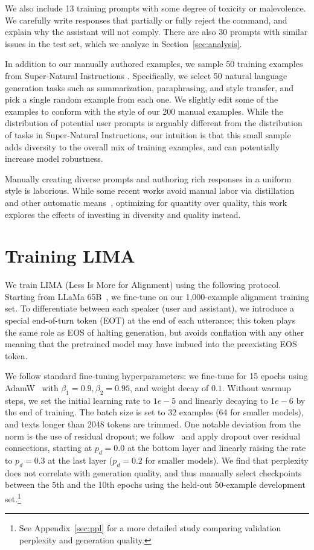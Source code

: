 \documentclass{article}
\begin{document}
We also include 13 training prompts with some degree of toxicity or malevolence.
We carefully write responses that partially or fully reject the command, and explain why the assistant will not comply.
There are also 30 prompts with similar issues in the test set, which we analyze in Section~\ref{sec:analysis}.

In addition to our manually authored examples, we sample 50 training examples from Super-Natural Instructions \citep{supernaturalinstructions}.
Specifically, we select 50 natural language generation tasks such as summarization, paraphrasing, and style transfer, and pick a single random example from each one.
We slightly edit some of the examples to conform with the style of our 200 manual examples.
While the distribution of potential user prompts is arguably different from the distribution of tasks in Super-Natural Instructions, our intuition is that this small sample adds diversity to the overall mix of training examples, and can potentially increase model robustness.

Manually creating diverse prompts and authoring rich responses in a uniform style is laborious.
While some recent works avoid manual labor via distillation and other automatic means~\citep{honovich2022unnatural, wang2022selfinstruct, alpaca, vicuna2023, sun2023principledriven}, optimizing for quantity over quality, this work explores the effects of investing in diversity and quality instead.

\section{Training LIMA}
\label{sec:training}

We train LIMA (Less Is More for Alignment) using the following protocol.
Starting from LLaMa 65B~\citep{touvron2023llama}, we fine-tune on our 1,000-example alignment training set.
To differentiate between each speaker (user and assistant), we introduce a special end-of-turn token (EOT) at the end of each utterance; this token plays the same role as EOS of halting generation, but avoids conflation with any other meaning that the pretrained model may have imbued into the preexisting EOS token.

We follow standard fine-tuning hyperparameters:
we fine-tune for 15 epochs using AdamW~\citep{loshchilov2017decoupled} with $\beta_1=0.9, \beta_2=0.95$, and weight decay of $0.1$.
Without warmup steps, we set the initial learning rate to $1e-5$ and linearly decaying to $1e-6$ by the end of training.
The batch size is set to 32 examples (64 for smaller models), and texts longer than 2048 tokens are trimmed.
One notable deviation from the norm is the use of residual dropout; we follow~\citet{ouyang2022training} and apply dropout over residual connections, starting at $p_d = 0.0$ at the bottom layer and linearly raising the rate to $p_d = 0.3$ at the last layer ($p_d = 0.2$ for smaller models).
We find that perplexity does not correlate with generation quality, and thus manually select checkpoints between the 5th and the 10th epochs using the held-out 50-example development set.\footnote{See Appendix~\ref{sec:ppl} for a more detailed study comparing validation perplexity and generation quality.}
\end{document}
